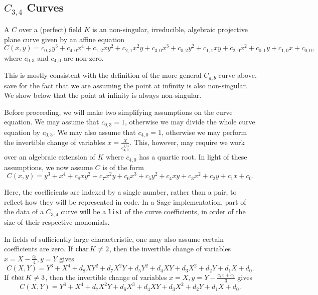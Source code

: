 
\subsection{$C_{3,4}$ Curves}

\begin{definition}
  A  $C$ over a (perfect) field $K$
  is an non-singular, irreducible, algebraic projective plane curve
  given by an affine equation
  \[ C(x,y) = c_{0,3}y^3 + c_{4,0}x^4 + c_{1,2}xy^2 + c_{2,1}x^2y + c_{3,0}x^3 + c_{0,2}y^2 + c_{1,1}xy + c_{2,0}x^2 + c_{0,1}y + c_{1,0}x + c_{0,0}, \]
  where $c_{0,3}$ and $c_{4,0}$ are non-zero.
\end{definition}
This is mostly consistent with the definition of the more general $C_{a,b}$ curve above,
save for the fact that we are assuming the point at infinity is also non-singular.
We show below that the point at infinity is always non-singular.

Before proceeding, we will make two simplifying assumptions on the curve equation.
We may assume that $c_{0,3} = 1$, otherwise we may divide the whole curve equation by $c_{0,3}$.
We may also assume that $c_{4,0} = 1$, otherwise we may perform the invertible change of variables $x = \frac X {c_{4,0}^{1/4}}$.
This, however, may require we work over an algebraic extension of $K$ where $c_{4,0}$ has a quartic root.
In light of these assumptions, we now assume $C$ is of the form
\begin{equation}
  \label{eq_c34}
  C(x,y) = y^3 + x^4 + c_8xy^2 + c_7x^2y + c_6x^3 + c_5y^2 + c_4xy + c_3x^2 + c_2y + c_1x + c_0.
\end{equation}

Here, the coefficients are indexed by a single number, rather than a pair, to reflect how they will be represented in code.
In a Sage implementation, part of the data of a $C_{3,4}$ curve will be a {\tt list} of the curve coefficients,
in order of the size of their respective monomials.

In fields of sufficiently large characteristic, one may also assume certain coefficients are zero.
If $\operatorname{char} K \neq 2$, then the invertible change of variables $x = X - \frac {c_6} 4, y = Y$ gives
\begin{equation}
  \label{eq_c34_char_not_2}
  C(X,Y) = Y^3 + X^4 + d_8XY^2 + d_7X^2Y + d_5Y^2 + d_4XY + d_3X^2 + d_2Y + d_1X + d_0.
\end{equation}
If $\operatorname{char} K \neq 3$, then the invertible change of variables $x = X, y = Y - \frac{c_8x + c_5}{3}$ gives
\begin{equation}
  \label{eq_c34_char_not_3}
  C(X,Y) = Y^3 + X^4 + d_7X^2Y + d_6X^3 + d_4XY + d_3X^2 + d_2Y + d_1X + d_0.
\end{equation}

